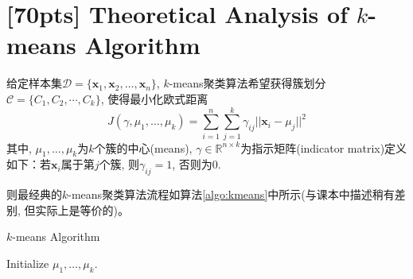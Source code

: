 \documentclass[a4paper,UTF8]{article}
\numberwithin{equation}{section}
\theoremstyle{definition}
\begin{document}
\section{[70pts] Theoretical Analysis of $k$-means Algorithm}
给定样本集$\mathcal{D} = \{ \mathbf x_1,\mathbf x_2, \ldots, \mathbf x_n \}$, $k$-means聚类算法希望获得簇划分$\mathcal{C}=\{C_1,C_2,\cdots,C_k\}$, 使得最小化欧式距离
\begin{equation}
\label{eq-kmeans-l2}
J(\gamma, \mu_1,\ldots,\mu_k) = \sum_{i=1}^n \sum_{j=1}^k \gamma_{ij}||\mathbf x_i - \mu_j||^2
\end{equation} 
其中, $\mu_1, \ldots, \mu_k$为$k$个簇的中心(means), $\gamma \in \mathbb{R}^{n\times k}$为指示矩阵(indicator matrix)定义如下：若$\mathbf x_i$属于第$j$个簇, 则$\gamma_{ij} = 1$, 否则为0. 

则最经典的$k$-means聚类算法流程如算法\ref{algo:kmeans}中所示(与课本中描述稍有差别, 但实际上是等价的)。
\begin{algorithm}[]
\label{algo:kmeans}
\caption{$k$-means Algorithm}
\setcounter{AlgoLine}{0}
Initialize $\mu_1, \ldots, \mu_k$.\\
\end{algorithm}
\end{document}
